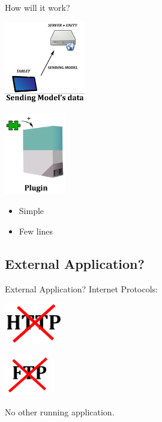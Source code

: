\documentclass[a4paper,10pt]{beamer}
\begin{document}
			\begin{frame}{How will it work?}
				\begin{multicols}{2}
					\includegraphics[height=100pt]{images/network/sending_model.png}
					\pause
					
					\columnbreak
					\includegraphics[height=100pt]{images/network/plugin.png}
					\begin{itemize}
						\item Simple
						\item Few lines
					\end{itemize}
				\end{multicols}
				
			\end{frame}
			
		\subsection{External Application?}
			
			\begin{frame}{External Application?}
				Internet Protocols:
				
				\begin{multicols}{2}
					\includegraphics[height=50pt]{images/network/nohttp.png}
					
					\columnbreak
					\includegraphics[height=50pt]{images/network/noftp.png}
				\end{multicols}
				
				\pause
				
				No other running application.
			\end{frame}
			
\end{document}
